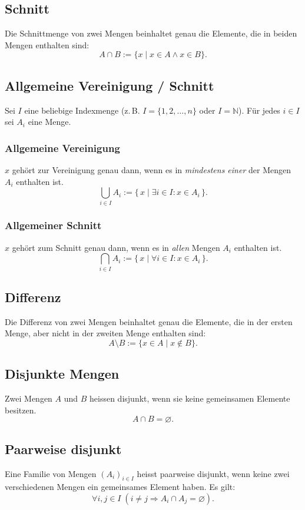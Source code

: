 \documentclass[10pt,landscape]{article}
\begin{document}
\begin{multicols*}{4}
\subsection{Schnitt}
Die Schnittmenge von zwei Mengen beinhaltet genau die Elemente, die in beiden Mengen enthalten sind:
\[
A\cap B:=\{x\mid x\in A\land x\in B\}.
\]

\subsection{Allgemeine Vereinigung / Schnitt}
Sei \(I\) eine beliebige Indexmenge (z.\,B. \(I = \{1,2,\dots,n\}\) oder \(I = \mathbb{N}\)).  
Für jedes \(i \in I\) sei \(A_i\) eine Menge.

\subsubsection{Allgemeine Vereinigung}
\(x\) gehört zur Vereinigung genau dann, wenn es in \emph{mindestens einer} der Mengen \(A_i\) enthalten ist.
\[
\bigcup_{i \in I} A_i := \{\, x \mid \exists i \in I : x \in A_i \,\}.
\]


\subsubsection{Allgemeiner Schnitt}
\(x\) gehört zum Schnitt genau dann, wenn es in \emph{allen} Mengen \(A_i\) enthalten ist.
\[
\bigcap_{i \in I} A_i := \{\, x \mid \forall i \in I : x \in A_i \,\}.
\]

\subsection{Differenz}
Die Differenz von zwei Mengen beinhaltet genau die Elemente, die in der ersten Menge, aber nicht in der zweiten Menge enthalten sind:
\[
A\setminus B:=\{x\in A\mid x\notin B\}.
\]

\subsection*{Disjunkte Mengen}
Zwei Mengen \(A\) und \(B\) heissen disjunkt, wenn sie keine gemeinsamen Elemente besitzen.
\[
A \cap B = \varnothing.
\]

\subsection{Paarweise disjunkt}
Eine Familie von Mengen \((A_i)_{i \in I}\) heisst paarweise disjunkt, wenn keine zwei verschiedenen Mengen ein gemeinsames Element haben. Es gilt:
\[
\forall i,j \in I \; (i \neq j \Rightarrow A_i \cap A_j = \varnothing).
\]


\end{multicols*}
\end{document}
